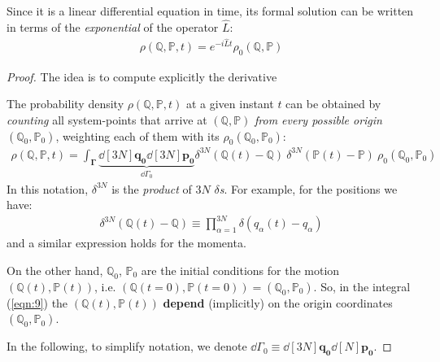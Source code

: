 \documentclass[../template.tex]{subfiles}
\begin{document}
Since it is a linear differential equation in time, its formal solution can be written in terms of the \textit{exponential} of the operator $\hat{L}$:
\begin{align*}
    \rho(\mathbb{Q},\mathbb{P},t) = e^{-i \hat{L} t} \rho_0(\mathbb{Q},\mathbb{P})
\end{align*} 

\begin{proof}
    The idea is to compute explicitly the derivative %

    
    The probability density $\rho(\mathbb{Q},\mathbb{P},t)$ at a given instant $t$ can be obtained by \textit{counting} all system-points that arrive at $(\mathbb{Q},\mathbb{P})$ \textit{from every possible origin} $(\mathbb{Q}_0,\mathbb{P}_0)$, weighting each of them with its  $\rho_0(\mathbb{Q}_0, \mathbb{P}_0)$:
    \begin{align}\label{eqn:9}
        \rho(\mathbb{Q},\mathbb{P},t) = \int_{\bm{\Gamma}} \underbrace{\dd[3N]{\bm{q_0}} \dd[3N]{\bm{p_0}} }_{\dd{\Gamma_0} } \delta^{3N} (\mathbb{Q}(t)- \mathbb{Q}) \> \delta^{3N}(\mathbb{P}(t) - \mathbb{P}) \> \rho_0(\mathbb{Q}_0, \mathbb{P}_0)
    \end{align}
    In this notation, $\delta^{3N}$ is the \textit{product} of $3N$ $\delta$\textit{s}. For example, for the positions we have:  %
    \begin{align*}
        \delta^{3N}(\mathbb{Q}(t) - \mathbb{Q}) \equiv \prod_{\alpha=1}^{3N} \delta(q_\alpha(t) - q_\alpha) 
    \end{align*}
    and a similar expression holds for the momenta.

    On the other hand, $\mathbb{Q}_0$, $\mathbb{P}_0$ are the initial conditions for the motion $(\mathbb{Q}(t), \mathbb{P}(t))$, i.e. $(\mathbb{Q}(t=0), \mathbb{P}(t=0)) = (\mathbb{Q}_0, \mathbb{P}_0)$. So, in the integral (\ref{eqn:9}) the $(\mathbb{Q}(t), \mathbb{P}(t))$ \textbf{depend} (implicitly) on the origin coordinates $(\mathbb{Q}_0, \mathbb{P}_0)$. 

    In the following, to simplify notation, we denote $\dd{\Gamma_0} \equiv \dd[3N]{\bm{q_0}} \dd[N]{\bm{p_0}}$. 

    \medskip


\end{proof}
\end{document}
